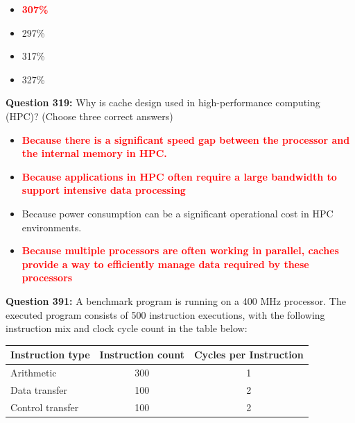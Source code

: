\documentclass[12pt,a4paper]{article}
\begin{document}
\begin{itemize}
    \item[\textbf{A.}] \textcolor{red}{\textbf{307\%}}
    \item[\textbf{B.}] 297\%
    \item[\textbf{C.}] 317\%
    \item[\textbf{D.}] 327\%
\end{itemize}

\vspace{0.5cm}

\vspace{0.5cm}

\textbf{Question 319:} Why is cache design used in high-performance computing (HPC)? (Choose three correct answers)

\begin{itemize}
    \item[\textbf{A.}] \textcolor{red}{\textbf{Because there is a significant speed gap between the processor and the internal memory in HPC.}}
    \item[\textbf{B.}] \textcolor{red}{\textbf{Because applications in HPC often require a large bandwidth to support intensive data processing}}
    \item[\textbf{C.}] Because power consumption can be a significant operational cost in HPC environments.
    \item[\textbf{D.}] \textcolor{red}{\textbf{Because multiple processors are often working in parallel, caches provide a way to efficiently manage data required by these processors}}
\end{itemize}

\vspace{0.5cm}

\vspace{0.5cm}

\textbf{Question 391:} A benchmark program is running on a 400 MHz processor. The executed program consists of 500 instruction executions, with the following instruction mix and clock cycle count in the table below:

\begin{center}
\renewcommand{\arraystretch}{1.3}
\begin{tabular}{|l|c|c|}
\hline
\textbf{Instruction type} & \textbf{Instruction count} & \textbf{Cycles per Instruction} \\ \hline
Arithmetic & 300 & 1 \\ \hline
Data transfer & 100 & 2 \\ \hline
Control transfer & 100 & 2 \\ \hline
\end{tabular}
\end{center}
\end{document}
